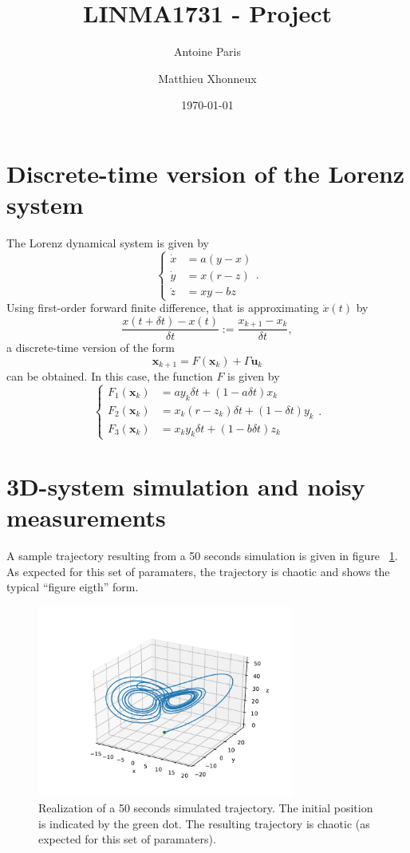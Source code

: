 \documentclass[english, DIV=13]{scrartcl}
\title{LINMA1731 - Project}
\author{Antoine Paris\and Matthieu Xhonneux}
\date{\today}
\renewcommand{\vec}[1]{\mathbf{#1}}
\begin{document}
\maketitle

\section{Discrete-time version of the Lorenz system}
The Lorenz dynamical system is given by
\begin{equation*}
    \begin{cases}
        \dot{x} &= a(y-x) \\
        \dot{y} &= x(r-z) \\
        \dot{z} &= xy - bz
    \end{cases}.
\end{equation*}
Using first-order forward finite difference, that is approximating $\dot{x}(t)$ by
\[ \frac{x(t+\delta t) - x(t)}{\delta t} := \frac{x_{k+1} - x_k}{\delta t}, \]
a discrete-time version of the form
\[ \vec{x}_{k+1} = F(\vec{x}_k) + \Gamma\vec{u}_k \]
can be obtained. In this case, the function $F$ is given by
\begin{equation*}
    \begin{cases}
        F_1(\vec{x}_k) &= ay_k\delta t + (1-a\delta t)x_k \\
        F_2(\vec{x}_k) &= x_k(r-z_k)\delta t + (1-\delta t)y_k \\
        F_3(\vec{x}_k) &= x_ky_k\delta t + (1-b\delta t)z_k
    \end{cases}.
\end{equation*}

\section{3D-system simulation and noisy measurements}
A sample trajectory resulting from a 50 seconds simulation is given in figure~
\ref{fig:q2-3d-trajectory}. As expected for this set of paramaters, the trajectory
is chaotic and shows the typical ``figure eigth'' form. 

\begin{figure}[ht]
    \centering
    \includegraphics[width=0.75\textwidth]{figures/q2-3d-trajectory}
    \caption{Realization of a 50 seconds simulated trajectory. The initial
    position is indicated by the green dot. The resulting trajectory is chaotic
    (as expected for this set of paramaters).}
    \label{fig:q2-3d-trajectory}
\end{figure}
\end{document}
